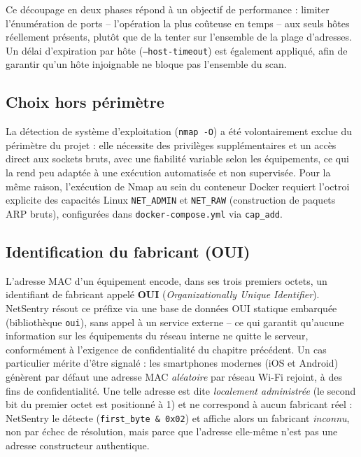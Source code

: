 Ce découpage en deux phases répond à un objectif de performance : limiter
l'énumération de ports -- l'opération la plus coûteuse en temps -- aux seuls hôtes
réellement présents, plutôt que de la tenter sur l'ensemble de la plage d'adresses. Un
délai d'expiration par hôte (\texttt{--host-timeout}) est également appliqué, afin de
garantir qu'un hôte injoignable ne bloque pas l'ensemble du scan.

\subsection{Choix hors périmètre}

La détection de système d'exploitation (\texttt{nmap -O}) a été volontairement exclue du
périmètre du projet : elle nécessite des privilèges supplémentaires et un accès direct
aux sockets bruts, avec une fiabilité variable selon les équipements, ce qui la rend peu
adaptée à une exécution automatisée et non supervisée. Pour la même raison,
l'exécution de Nmap au sein du conteneur Docker requiert l'octroi explicite des
capacités Linux \texttt{NET\_ADMIN} et \texttt{NET\_RAW} (construction de paquets ARP
bruts), configurées dans \texttt{docker-compose.yml} via \texttt{cap\_add}.

\subsection{Identification du fabricant (OUI)}

L'adresse MAC d'un équipement encode, dans ses trois premiers octets, un identifiant de
fabricant appelé \textbf{OUI} (\textit{Organizationally Unique Identifier}). NetSentry
résout ce préfixe via une base de données OUI statique embarquée (bibliothèque
\texttt{oui}), sans appel à un service externe -- ce qui garantit qu'aucune information
sur les équipements du réseau interne ne quitte le serveur, conformément à l'exigence de
confidentialité du chapitre précédent. Un cas particulier mérite d'être signalé : les
smartphones modernes (iOS et Android) génèrent par défaut une adresse MAC
\textit{aléatoire} par réseau Wi-Fi rejoint, à des fins de confidentialité. Une telle
adresse est dite \textit{localement administrée} (le second bit du premier octet est
positionné à 1) et ne correspond à aucun fabricant réel : NetSentry le détecte
(\texttt{first\_byte \& 0x02}) et affiche alors un fabricant \textit{inconnu}, non par
échec de résolution, mais parce que l'adresse elle-même n'est pas une adresse
constructeur authentique.

